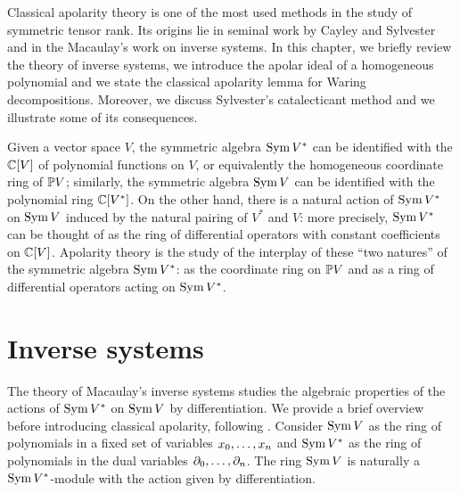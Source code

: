 Classical apolarity theory is one of the most used methods in the study of symmetric tensor rank. Its origins lie in seminal work by Cayley \cite{Cay45} and Sylvester \cite{Syl52,Syl53} and in the Macaulay's work on inverse systems. In this chapter, we briefly review the theory of inverse systems, we introduce the apolar ideal of a homogeneous polynomial and we state the classical apolarity lemma for Waring decompositions. Moreover, we discuss Sylvester's catalecticant method and we illustrate some of its consequences.

Given a vector space $V$, the symmetric algebra $\operatorname{Sym} V^*$ can be identified with the $\mathbb{C}[V]$ of polynomial functions on $V$, or equivalently the homogeneous coordinate ring of $\mathbb{P} V$; similarly, the symmetric algebra $\operatorname{Sym} V$ can be identified with the polynomial ring $\mathbb{C}[V^*]$. On the other hand, there is a natural action of $\operatorname{Sym} V^*$ on $\operatorname{Sym} V$ induced by the natural pairing of $V^*$ and $V$: more precisely, $\operatorname{Sym} V^*$ can be thought of as the ring of differential operators with constant coefficients on $\mathbb{C}[V]$. Apolarity theory is the study of the interplay of these ``two natures'' of the symmetric algebra $\operatorname{Sym} V^*$: as the coordinate ring on $\mathbb{P} V$ and as a ring of differential operators acting on $\operatorname{Sym} V^*$.

\section{Inverse systems}
\label{apolarity-section-inverseSystems}
The theory of Macaulay's inverse systems studies the algebraic properties of the actions of $\operatorname{Sym} V^*$ on $\operatorname{Sym} V$ by differentiation. We provide a brief overview before introducing classical apolarity, following \cite{Ger96}. Consider $\operatorname{Sym} V$ as the ring of polynomials in a fixed set of variables $x_0 , \ldots , x_n$ and $\operatorname{Sym} V^*$ as the ring of polynomials in the dual variables $\partial_0 , \ldots , \partial_n$. The ring $\operatorname{Sym} V$ is naturally a $\operatorname{Sym} V^*$-module with the action given by differentiation.


